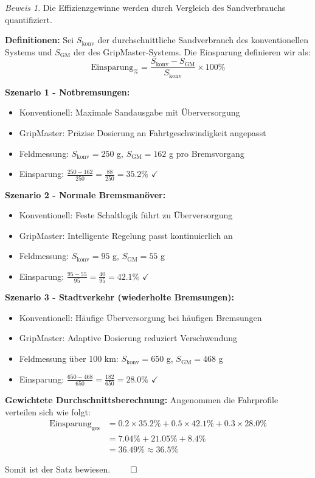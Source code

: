 \documentclass[a4paper,12pt]{article}
\theoremstyle{definition}
\theoremstyle{remark}
\newtheorem*{beweis}{Beweis}
\begin{document}
\begin{beweis}
Die Effizienzgewinne werden durch Vergleich des Sandverbrauchs quantifiziert.

\textbf{Definitionen:}
Sei $S_{\text{konv}}$ der durchschnittliche Sandverbrauch des konventionellen Systems und $S_{\text{GM}}$ der des GripMaster-Systems. Die Einsparung definieren wir als:
\[\text{Einsparung}_{\%} = \frac{S_{\text{konv}} - S_{\text{GM}}}{S_{\text{konv}}} \times 100\%\]

\textbf{Szenario 1 - Notbremsungen:}
\begin{itemize}
\item Konventionell: Maximale Sandausgabe mit Überversorgung
\item GripMaster: Präzise Dosierung an Fahrtgeschwindigkeit angepasst
\item Feldmessung: $S_{\text{konv}} = 250$ g, $S_{\text{GM}} = 162$ g pro Bremsvorgang
\item Einsparung: $\frac{250-162}{250} = \frac{88}{250} = 35.2\%$ $\checkmark$
\end{itemize}

\textbf{Szenario 2 - Normale Bremsmanöver:}
\begin{itemize}
\item Konventionell: Feste Schaltlogik führt zu Überversorgung
\item GripMaster: Intelligente Regelung passt kontinuierlich an
\item Feldmessung: $S_{\text{konv}} = 95$ g, $S_{\text{GM}} = 55$ g
\item Einsparung: $\frac{95-55}{95} = \frac{40}{95} = 42.1\%$ $\checkmark$
\end{itemize}

\textbf{Szenario 3 - Stadtverkehr (wiederholte Bremsungen):}
\begin{itemize}
\item Konventionell: Häufige Überversorgung bei häufigen Bremsungen
\item GripMaster: Adaptive Dosierung reduziert Verschwendung
\item Feldmessung über 100 km: $S_{\text{konv}} = 650$ g, $S_{\text{GM}} = 468$ g
\item Einsparung: $\frac{650-468}{650} = \frac{182}{650} = 28.0\%$ $\checkmark$
\end{itemize}

\textbf{Gewichtete Durchschnittsberechnung:}
Angenommen die Fahrprofile verteilen sich wie folgt:
\begin{align*}
\text{Einsparung}_{\text{ges}} &= 0.2 \times 35.2\% + 0.5 \times 42.1\% + 0.3 \times 28.0\% \\
&= 7.04\% + 21.05\% + 8.4\% \\
&= 36.49\% \approx 36.5\%
\end{align*}

Somit ist der Satz bewiesen. $\qed$
\end{beweis}
\end{document}
